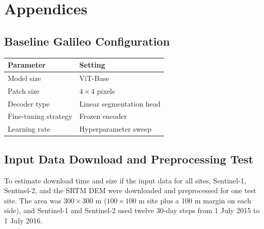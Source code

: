 \documentclass[a4paper,12pt]{article}
\makeatletter
\newenvironment{placedtable}
  {\par\addvspace{\intextsep}\noindent\begin{minipage}{\linewidth}\def\@captype{table}}
  {\end{minipage}\par\addvspace{\intextsep}}
\makeatother
\begin{document}
\clearpage
{}



\clearpage
\appendix
\section*{Appendices}
\renewcommand{\thesubsection}{\Alph{subsection}}
\subsection{Baseline Galileo Configuration}
\label{app:galileo-baseline}
\setcounter{table}{0}
\renewcommand{\thetable}{\thesubsection.\arabic{table}}

\begin{placedtable}
  \centering
  \caption{Baseline Galileo configuration adapted from \citet{tsengGalileoLearningGlobal2025}.}
  \label{tab:galileo_baseline}
  \small
  \begin{tabularx}{\textwidth}{@{}>{\raggedright\arraybackslash}p{} >{\raggedright\arraybackslash}X@{}}
    \hline
    \textbf{Parameter}   & \textbf{Setting}         \\
    \hline
    Model size           & ViT-Base                 \\[0.4em]
    Patch size           & \(4 \times 4\) pixels    \\[0.4em]
    Decoder type         & Linear segmentation head \\[0.4em]
    Fine-tuning strategy & Frozen encoder           \\[0.4em]
    Learning rate        & Hyperparameter sweep     \\[0.4em]
    \hline
  \end{tabularx}
\end{placedtable}

\subsection{Input Data Download and Preprocessing Test}
\label{app:input-data-test}
\setcounter{table}{0}

To estimate download time and size if the input data for all sites, Sentinel-1, Sentinel-2, and the SRTM \ac{DEM} were downloaded and preprocessed for one test site. The area was \(300 \times 300\) m (\(100 \times 100\) m site plus a 100 m margin on each side), and Sentinel-1 and Sentinel-2 used twelve 30-day steps from 1 July 2015 to 1 July 2016.
\end{document}
